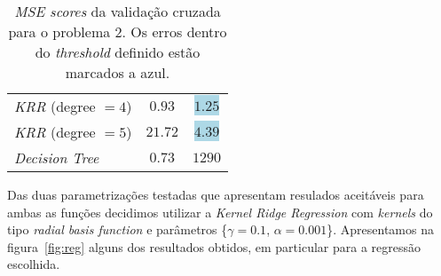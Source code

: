 \documentclass[a4paper,twocolumn]{article}
\begin{document}
\begin{table}[ht]
\begin{tabular}{ l c c }
         \textit{KRR\footnotemark[2]} (degree $= 4$)                      & $0.93$ & \colorbox{lightblue}{$1.25$} \\
         \textit{KRR\footnotemark[2]} (degree $= 5$)                      & $21.72$ & \colorbox{lightblue}{$4.39$} \\
         \textit{Decision Tree}                                          & $0.73$ & $1290$ \\
        \end{tabular}
        \caption{\textit{MSE scores} da validação cruzada para o problema 2.
        Os erros dentro do \textit{threshold} definido estão marcados a azul.}
        \label{tab:cv2}
    \end{table}

    Das duas parametrizações testadas que apresentam resulados aceitáveis para ambas as funções decidimos utilizar
    a \textit{Kernel Ridge Regression} com \textit{kernels} do tipo \textit{radial basis function} e parâmetros
    \{$\gamma = 0.1$,  $\alpha = 0.001$\}. Apresentamos na figura~\ref{fig:reg} alguns dos resultados obtidos,
    em particular para a regressão escolhida.
\end{document}
